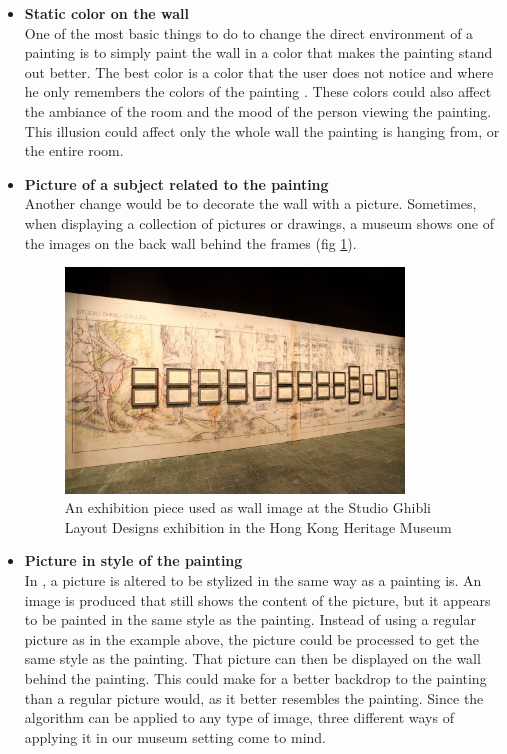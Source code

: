 \documentclass[a4paper]{article}
\begin{document}
\begin{itemize}

\item{\textbf{Static color on the wall}} %
\\One of the most basic things to do to change the direct environment of a painting is to simply paint the wall in a color that makes the painting stand out better. The best color is a color that the user does not notice and where he only remembers the colors of the painting \cite{colorwall}. These colors could also affect the ambiance of the room and the mood of the person\cite{mood} viewing the painting. This illusion could affect only the whole wall the painting is hanging from, or the entire room.

\item{\textbf{Picture of a subject related to the painting}} 
\\Another change would be to decorate the wall with a picture. Sometimes, when displaying a collection of pictures or drawings, a museum shows one of the images on the back wall behind the frames (fig \ref{fig:picturewall}).

\begin{figure}[h!]
\label{fig:picturewall}
\centering
\includegraphics[width = 90mm]{PictureWall.jpg}
\caption{An exhibition piece used as wall image at the Studio Ghibli Layout Designs exhibition in the Hong Kong Heritage Museum \cite{ghibli}}
\end{figure}

\item{\textbf{Picture in style of the painting}}
\\In \cite{gatys}, a picture is altered to be stylized in the same way as a painting is. An image is produced that still shows the content of the picture, but it appears to be painted in the same style as the painting. Instead of using a regular picture as in the example above, the picture could be processed to get the same style as the painting. That picture can then be displayed on the wall behind the painting. This could make for a better backdrop to the painting than a regular picture would, as it better resembles the painting. Since the algorithm can be applied to any type of image, three different ways of applying it in our museum setting come to mind. 


\end{itemize}
\end{document}
